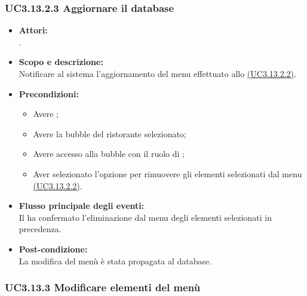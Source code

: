 \subsubsection{UC3.13.2.3 Aggiornare il database} \label{UC3.13.2.3}

\begin{itemize}
	\item \textbf{Attori:}
	\\.
	\item \textbf{Scopo e descrizione:} 
	\\Notificare al sistema l'aggiornamento del menu effettuato allo \hyperref[UC3.13.2.2]{(UC3.13.2.2)}.
	\item \textbf{Precondizioni:}
	\begin{itemize}
		\item Avere ;
		\item Avere la bubble del ristorante selezionato;
		\item Avere accesso alla bubble con il ruolo di ;
		\item Aver selezionato l’opzione per rimuovere gli elementi selezionati dal menu \hyperref[UC3.13.2.2]{(UC3.13.2.2)}.
	\end{itemize}
	\item \textbf{Flusso principale degli eventi:}
	\\Il {} ha confermato l’eliminazione dal menu degli elementi selezionati in precedenza.
	\item \textbf{Post-condizione:}
	\\La modifica del menù è stata propagata al database.
\end{itemize}

\subsubsection{UC3.13.3 Modificare elementi del menù} \label{UC3.13.3}

